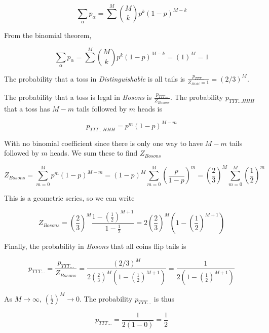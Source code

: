 \begin{enumerate}
\begin{enumerate}
$$
\sum_{\alpha} p_{\alpha} = \sum^{M} \binom{M}{k} p^{k} (1-p)^{M-k}
$$

From the binomial theorem,

$$
\sum_{\alpha} p_{\alpha} = \sum^{M} \binom{M}{k} p^{k} (1-p)^{M-k} = (1)^M = 1
$$

The probability that a toss in \textit{Distinguishable} is all tails is $\frac{p_{TTT...}}{Z_{Disti} = 1} = (2/3)^M$.

The probability that a toss is legal in \textit{Bosons} is $\frac{p_{TTT...}}{Z_{Bosons}}$. The probability $p_{TTT...HHH}$ that a toss has $M-m$ tails followed by $m$ heads is

$$
p_{TTT...HHH} =  p^{m} (1-p)^{M-m}
$$

With no binomial coefficient since there is only one way to have $M-m$ tails followed by $m$ heads. We sum these to find $Z_{Bosons}$

$$
Z_{Bosons} = \sum^{M}_{m=0} p^{m} (1-p)^{M-m} = (1-p)^M \sum^{M}_{m=0} (\frac{p}{1-p})^m  = (\frac{2}{3})^M \sum^{M}_{m=0} (\frac{1}{2})^m 
$$


This is a geometric series, so we can write

$$  
Z_{Bosons} = (\frac{2}{3})^M \frac{1-(\frac{1}{2})^{M+1}}{1-\frac{1}{2}} = 2(\frac{2}{3})^M (1-(\frac{1}{2})^{M+1})
$$

Finally, the probability in \textit{Bosons} that all coins flip tails is

$$
p_{TTT...} = \frac{p_{TTT...}}{Z_{Bosons}} = \frac{(2/3)^M}{2(\frac{2}{3})^M (1-(\frac{1}{2})^{M+1})} = \frac{1}{2(1-(\frac{1}{2})^{M+1})}
$$




As $M \to \infty$, $(\frac{1}{2})^M \to 0$. The probability $p_{TTT...}$ is thus

$$
p_{TTT...} = \frac{1}{2(1-0)} = \frac{1}{2}
$$
\end{enumerate}


\end{enumerate}
